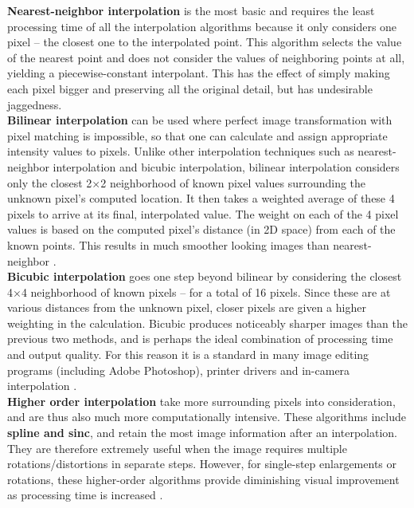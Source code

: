 \documentclass[]{usiinfbachelorproject}
\begin{document}
{\bf Nearest-neighbor interpolation} is the most basic and requires the least processing time of all the interpolation algorithms because it only considers one pixel -- the closest one to the interpolated point. This algorithm selects the value of the nearest point and does not consider the values of neighboring points at all, yielding a piecewise-constant interpolant. This has the effect of simply making each pixel bigger and preserving all the original detail, but has undesirable jaggedness.\\

{\bf Bilinear interpolation} can be used where perfect image transformation with pixel matching is impossible, so that one can calculate and assign appropriate intensity values to pixels. Unlike other interpolation techniques such as nearest-neighbor interpolation and bicubic interpolation, bilinear interpolation considers only the closest 2$\times$2 neighborhood of known pixel values surrounding the unknown pixel's computed location. It then takes a weighted average of these 4 pixels to arrive at its final, interpolated value. The weight on each of the 4 pixel values is based on the computed pixel's distance (in 2D space) from each of the known points. This results in much smoother looking images than nearest-neighbor \cite{website:interpolation}.\\

{\bf Bicubic interpolation} goes one step beyond bilinear by considering the closest 4$\times$4 neighborhood of known pixels -- for a total of 16 pixels. Since these are at various distances from the unknown pixel, closer pixels are given a higher weighting in the calculation. Bicubic produces noticeably sharper images than the previous two methods, and is perhaps the ideal combination of processing time and output quality. For this reason it is a standard in many image editing programs (including Adobe Photoshop), printer drivers and in-camera interpolation \cite{website:interpolation}.\\

{\bf Higher order interpolation} take more surrounding pixels into consideration, and are thus also much more computationally intensive. These algorithms include {\bf spline and sinc}, and retain the most image information after an interpolation. They are therefore extremely useful when the image requires multiple rotations/distortions in separate steps. However, for single-step enlargements or rotations, these higher-order algorithms provide diminishing visual improvement as processing time is increased \cite{website:interpolation}.\\
\end{document}
